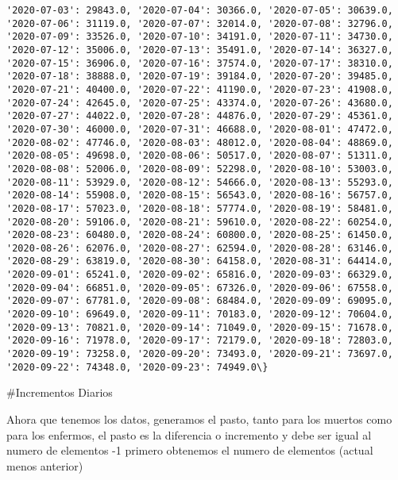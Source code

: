 \documentclass[11pt]{article}
\begin{document}
\begin{Verbatim}[commandchars=\\\{\}]
'2020-07-03': 29843.0, '2020-07-04': 30366.0, '2020-07-05': 30639.0,
'2020-07-06': 31119.0, '2020-07-07': 32014.0, '2020-07-08': 32796.0,
'2020-07-09': 33526.0, '2020-07-10': 34191.0, '2020-07-11': 34730.0,
'2020-07-12': 35006.0, '2020-07-13': 35491.0, '2020-07-14': 36327.0,
'2020-07-15': 36906.0, '2020-07-16': 37574.0, '2020-07-17': 38310.0,
'2020-07-18': 38888.0, '2020-07-19': 39184.0, '2020-07-20': 39485.0,
'2020-07-21': 40400.0, '2020-07-22': 41190.0, '2020-07-23': 41908.0,
'2020-07-24': 42645.0, '2020-07-25': 43374.0, '2020-07-26': 43680.0,
'2020-07-27': 44022.0, '2020-07-28': 44876.0, '2020-07-29': 45361.0,
'2020-07-30': 46000.0, '2020-07-31': 46688.0, '2020-08-01': 47472.0,
'2020-08-02': 47746.0, '2020-08-03': 48012.0, '2020-08-04': 48869.0,
'2020-08-05': 49698.0, '2020-08-06': 50517.0, '2020-08-07': 51311.0,
'2020-08-08': 52006.0, '2020-08-09': 52298.0, '2020-08-10': 53003.0,
'2020-08-11': 53929.0, '2020-08-12': 54666.0, '2020-08-13': 55293.0,
'2020-08-14': 55908.0, '2020-08-15': 56543.0, '2020-08-16': 56757.0,
'2020-08-17': 57023.0, '2020-08-18': 57774.0, '2020-08-19': 58481.0,
'2020-08-20': 59106.0, '2020-08-21': 59610.0, '2020-08-22': 60254.0,
'2020-08-23': 60480.0, '2020-08-24': 60800.0, '2020-08-25': 61450.0,
'2020-08-26': 62076.0, '2020-08-27': 62594.0, '2020-08-28': 63146.0,
'2020-08-29': 63819.0, '2020-08-30': 64158.0, '2020-08-31': 64414.0,
'2020-09-01': 65241.0, '2020-09-02': 65816.0, '2020-09-03': 66329.0,
'2020-09-04': 66851.0, '2020-09-05': 67326.0, '2020-09-06': 67558.0,
'2020-09-07': 67781.0, '2020-09-08': 68484.0, '2020-09-09': 69095.0,
'2020-09-10': 69649.0, '2020-09-11': 70183.0, '2020-09-12': 70604.0,
'2020-09-13': 70821.0, '2020-09-14': 71049.0, '2020-09-15': 71678.0,
'2020-09-16': 71978.0, '2020-09-17': 72179.0, '2020-09-18': 72803.0,
'2020-09-19': 73258.0, '2020-09-20': 73493.0, '2020-09-21': 73697.0,
'2020-09-22': 74348.0, '2020-09-23': 74949.0\}
    \end{Verbatim}

    \#Incrementos Diarios

    Ahora que tenemos los datos, generamos el pasto, tanto para los muertos
como para los enfermos, el pasto es la diferencia o incremento y debe
ser igual al numero de elementos -1 primero obtenemos el numero de
elementos (actual menos anterior)
\end{document}
